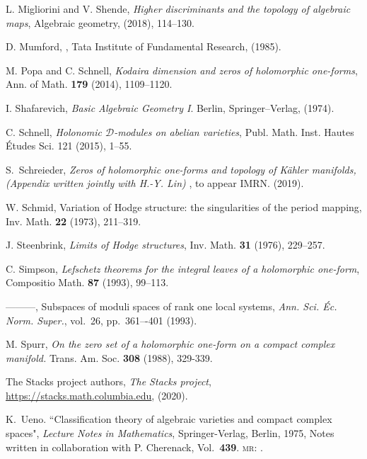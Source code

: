 \documentclass[12pt,reqno]{amsart}
\theoremstyle{question}
\theoremstyle{definition}
\theoremstyle{remark}
\theoremstyle{cited}
\theoremstyle{citeddef}
\begin{document}
\begin{thebibliography}{ADMSP}
 L. Migliorini and V. Shende, \textit{Higher discriminants and the topology of algebraic maps}, Algebraic geometry, (2018), 114--130.

 D. Mumford, , Tata Institute of Fundamental Research, (1985).

 M. Popa and C. Schnell, \textit{Kodaira dimension and zeros of holomorphic one-forms}, Ann. of Math. \textbf{179} (2014), 1109--1120.


 I. Shafarevich, \textit{Basic Algebraic Geometry I}. Berlin, Springer--Verlag, (1974).

C. Schnell, {\it  Holonomic $\mathcal{D}$-modules on abelian varieties},
Publ. Math. Inst. Hautes \'{E}tudes Sci. 121 (2015), 1--55.

 S.\ Schreieder, \textit{Zeros of holomorphic one-forms and topology of K\"ahler manifolds, (Appendix written jointly with H.-Y. Lin) }, to appear IMRN. (2019).

 W. Schmid, Variation of Hodge structure: the singularities of the period mapping, Inv. Math. \textbf{22} (1973), 211--319.

 J. Steenbrink, \textit{Limits of Hodge structures}, Inv. Math. \textbf{31} (1976), 229--257.




 C. Simpson, \textit{Lefschetz theorems for the integral leaves of a holomorphic one-form}, Compositio Math. \textbf{87} (1993), 99--113.

 ---------, Subspaces of moduli spaces of rank one local systems, \textit{Ann. Sci. \'Ec. Norm. Super.}, vol.\ 26,
pp.\ 361–-401 (1993).

 M. Spurr, {\it On the zero set of a holomorphic one-form on a compact complex manifold.} Trans. Am.
Soc. \textbf{308} (1988), 329-339. 

 The {Stacks project authors}, \textit{The Stacks project}, \url{https://stacks.math.columbia.edu}, (2020).

 K.\ Ueno. ``Classification theory of algebraic varieties and compact complex spaces", \textit{Lecture Notes in Mathematics},
Springer-Verlag, Berlin, 1975, Notes written in collaboration with P. Cherenack, Vol.\ \textbf{439}. 
\textsc{mr}: \href{http://www.ams.org/mathscinet-getitem?mr=0506253}{}.



\end{thebibliography}
\end{document}
